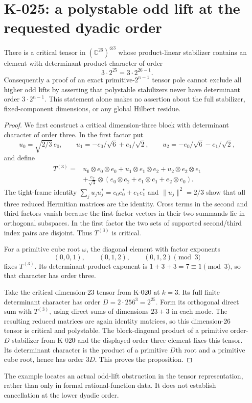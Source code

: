 \section{K-025: a polystable odd lift at the requested dyadic order}

\begin{proposition}[K-025]
There is a critical tensor in $(\mathbb C^{26})^{\otimes3}$ whose
product-linear stabilizer contains an element with determinant-product
character of order
\[
                         3\cdot2^{25}=3\cdot2^{26-1}.
\]
Consequently a proof of an exact primitive-$2^{n-1}$ tensor pole
cannot exclude all higher odd lifts by asserting that polystable
stabilizers never have determinant order $3\cdot2^{n-1}$.
This statement alone makes no assertion about the full stabilizer,
fixed-component dimensions, or any global Hilbert residue.
\end{proposition}

\begin{proof}
We first construct a critical dimension-three block with determinant
character of order three.  In the first factor put
\[
 u_0=\sqrt{2/3}\,e_0,\qquad
 u_1=-e_0/\sqrt6+e_1/\sqrt2,\qquad
 u_2=-e_0/\sqrt6-e_1/\sqrt2,
\]
and define
\[
\begin{split}
 T^{(3)}={}&u_0\otimes e_0\otimes e_0
       +u_1\otimes e_1\otimes e_2
       +u_2\otimes e_2\otimes e_1\\
       &+\frac{e_2}{\sqrt3}\otimes
          (e_0\otimes e_2+e_1\otimes e_1+e_2\otimes e_0).
\end{split}
\]
The tight-frame identity
$\sum_j u_ju_j^*=e_0e_0^*+e_1e_1^*$ and
$\|u_j\|^2=2/3$ show that all three reduced Hermitian matrices
are the identity.  Cross terms in the second and third factors
vanish because the first-factor vectors in their two summands
lie in orthogonal subspaces.  In the first factor the two
sets of supported second/third index pairs are disjoint.
Thus $T^{(3)}$ is critical.

For a primitive cube root $\omega$, the diagonal element with
factor exponents
\[
                   (0,0,1),\qquad(0,1,2),\qquad(0,1,2)
                              \pmod3
\]
fixes $T^{(3)}$.  Its determinant-product exponent is
$1+3+3=7\equiv1\pmod3$, so that character has order three.

Take the critical dimension-$23$ tensor from K-020 at $k=3$.
Its full finite determinant character has order
$D=2\cdot256^3=2^{25}$.  Form its orthogonal direct sum with
$T^{(3)}$, using direct sums of dimensions $23+3$ in each mode.
The resulting reduced matrices are again identity matrices,
so this dimension-$26$ tensor is critical and polystable.
The block-diagonal product of a primitive order-$D$ stabilizer
from K-020 and the displayed order-three element fixes this
tensor.  Its determinant character is the product of a primitive
$D$th root and a primitive cube root, hence has order $3D$.
This proves the proposition.
\end{proof}

The example locates an actual odd-lift obstruction in the tensor
representation, rather than only in formal rational-function data.
It does not establish cancellation at the lower dyadic order.
